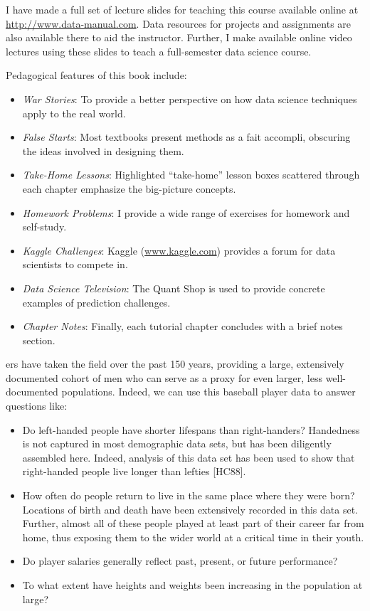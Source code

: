 \documentclass[10pt]{article}
\begin{document}
I have made a full set of lecture slides for teaching this course available online at \url{http://www.data-manual.com}. Data resources for projects and assignments are also available there to aid the instructor. Further, I make available online video lectures using these slides to teach a full-semester data science course.

Pedagogical features of this book include:
\begin{itemize}
  \item \textit{War Stories}: To provide a better perspective on how data science techniques apply to the real world.
  \item \textit{False Starts}: Most textbooks present methods as a fait accompli, obscuring the ideas involved in designing them.
  \item \textit{Take-Home Lessons}: Highlighted ``take-home'' lesson boxes scattered through each chapter emphasize the big-picture concepts.
  \item \textit{Homework Problems}: I provide a wide range of exercises for homework and self-study.
  \item \textit{Kaggle Challenges}: Kaggle (\url{www.kaggle.com}) provides a forum for data scientists to compete in.
  \item \textit{Data Science Television}: The Quant Shop is used to provide concrete examples of prediction challenges.
  \item \textit{Chapter Notes}: Finally, each tutorial chapter concludes with a brief notes section. 
\end{itemize}


ers have taken the field over the past 150 years, providing a large, extensively documented cohort of men who can serve as a proxy for even larger, less well-documented populations. Indeed, we can use this baseball player data to answer questions like:

\begin{itemize}
  \item Do left-handed people have shorter lifespans than right-handers? Handedness is not captured in most demographic data sets, but has been diligently assembled here. Indeed, analysis of this data set has been used to show that right-handed people live longer than lefties [HC88].
  \item How often do people return to live in the same place where they were born? Locations of birth and death have been extensively recorded in this data set. Further, almost all of these people played at least part of their career far from home, thus exposing them to the wider world at a critical time in their youth.
  \item Do player salaries generally reflect past, present, or future performance?
  \item To what extent have heights and weights been increasing in the population at large?
\end{itemize}
\end{document}

